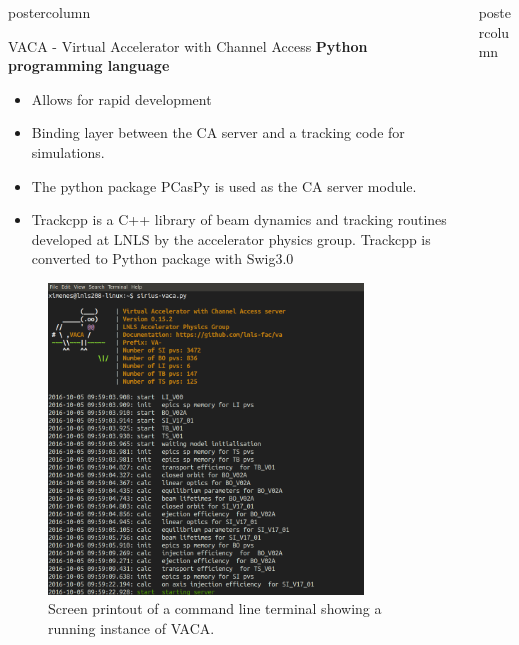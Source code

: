\documentclass[20pt]{beamer}
\begin{document}
\begin{frame}
\begin{columns}
\begin{column}{0.55\textwidth}
\begin{beamercolorbox}[center]{postercolumn}
\begin{minipage}{.98\textwidth}
{\begin{myblock}{VACA - Virtual Accelerator with Channel Access}
						\textbf{Python programming language}
						\begin{itemize}
							\item Allows for rapid development
							\item Binding layer between the CA server and a tracking code for simulations.
							\item The python package PCasPy is used as the CA server module.
							\item Trackcpp is a C++ library of beam dynamics and tracking routines developed at LNLS by the accelerator physics group. Trackcpp is converted to Python package with Swig3.0						
						\end{itemize}
						\begin{figure}
							\centering
							\includegraphics[width=0.855\textwidth]{../WEPOPRPO21f1.png}
							\caption{Screen printout of a command line terminal showing a running instance of VACA.}%
						\end{figure}
					\end{myblock}
					\vspace{0.5cm}
		}\end{minipage}\end{beamercolorbox}
	\end{column}
	\begin{column}{.45\textwidth}
		\begin{beamercolorbox}[center]{postercolumn}
			\begin{minipage}{.98\textwidth} %

\end{minipage}
\end{beamercolorbox}
\end{column}
\end{columns}
\end{frame}
\end{document}
